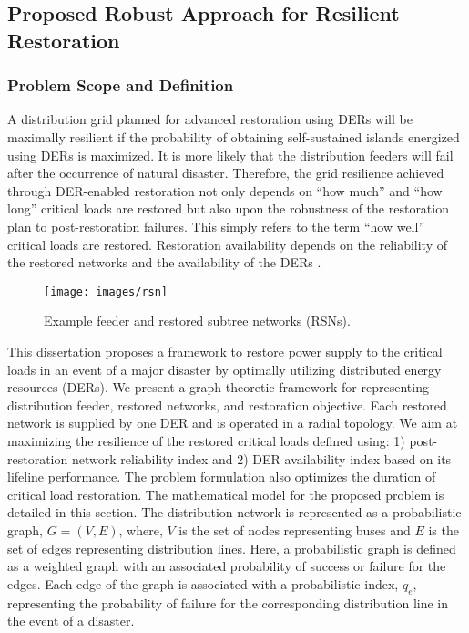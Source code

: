 \documentclass[12pt]{article}
\begin{document}
\subsection{Proposed Robust Approach for Resilient Restoration}
\subsubsection{Problem Scope and Definition}
A distribution grid planned for advanced restoration using DERs will be maximally resilient if the probability of obtaining self-sustained islands energized using DERs is maximized. It is more likely that the distribution feeders will fail after the occurrence of natural disaster. Therefore, the grid resilience achieved through DER-enabled restoration not only depends on ``how much'' and ``how long'' critical loads are restored but also upon the robustness of the restoration plan to post-restoration failures. This simply refers to the term ``how well'' critical loads are restored.  Restoration availability depends on the reliability of the restored networks and the availability of the DERs \cite{8421054}.

\begin{figure}[t]
\centering
    \texttt{[image: images/rsn]}
  \caption{Example feeder and restored subtree networks (RSNs).}
  \label{fig:rsn}
\end{figure}

This dissertation proposes a framework to restore power supply to the critical loads in an event of a major disaster by optimally utilizing distributed energy resources (DERs). We present a graph-theoretic framework for representing distribution feeder, restored networks, and restoration objective. Each restored network is supplied by one DER and is operated in a radial topology. We aim at maximizing the resilience of the restored critical loads defined using: 1) post-restoration network reliability index and 2) DER availability index based on its lifeline performance. The problem formulation also optimizes the duration of critical load restoration. The mathematical model for the proposed problem is detailed in this section.
The distribution network is represented as a probabilistic graph, $G=(V,E)$, where, $V$ is the set of nodes representing buses and $E$ is the set of edges representing distribution lines. Here, a probabilistic graph is defined as a weighted graph with an associated probability of success or failure for the edges. Each edge of the graph is associated with a probabilistic index, $q_e$, representing the probability of failure for the corresponding distribution line in the event of a disaster.
\end{document}
